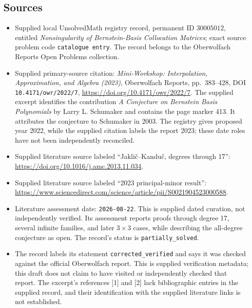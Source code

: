 \documentclass[11pt]{article}
\begin{document}
\subsection{Sources}
\begin{itemize}
\item Supplied local UnsolvedMath registry record, permanent ID \(30005012\), entitled \emph{Nonsingularity of Bernstein-Basis Collocation Matrices}; exact source problem code \texttt{catalogue entry}. The record belongs to the Oberwolfach Reports Open Problems collection.
\item Supplied primary-source citation: \emph{Mini-Workshop: Interpolation, Approximation, and Algebra (2023)}, Oberwolfach Reports, pp.\ 383--428, DOI \texttt{10.4171/owr/2022/7}, \url{https://doi.org/10.4171/owr/2022/7}. The supplied excerpt identifies the contribution \emph{A Conjecture on Bernstein Basis Polynomials} by Larry L. Schumaker and contains the page marker 413. It attributes the conjecture to Schumaker in 2003. The registry gives proposed year 2022, while the supplied citation labels the report 2023; these date roles have not been independently reconciled.
\item Supplied literature source labeled ``Jakli\v{c}--Kandu\v{c}, degrees through 17'': \url{https://doi.org/10.1016/j.amc.2013.11.034}.
\item Supplied literature source labeled ``2023 principal-minor result'': \url{https://www.sciencedirect.com/science/article/pii/S0021904523000588}.
\item Literature assessment date: \texttt{2026-08-22}. This is supplied dated curation, not independently verified. Its assessment reports proofs through degree 17, several infinite families, and later \(3\times3\) cases, while describing the all-degree conjecture as open. The record's status is \texttt{partially\_solved}.
\item The record labels its statement \texttt{corrected\_verified} and says it was checked against the official Oberwolfach report. This is supplied verification metadata; this draft does not claim to have visited or independently checked that report. The excerpt's references [1] and [2] lack bibliographic entries in the supplied record, and their identification with the supplied literature links is not established.
\end{itemize}
\end{document}
